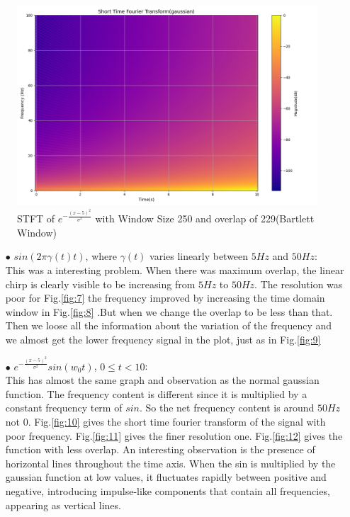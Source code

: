 \documentclass[12pt,a4paper,onecolumn]{exam}
\begin{document}
\begin{solution}
\begin{itemize}
\begin{itemize}
        \begin{figure}[H]
        \centering
        \includegraphics[scale = 0.35]{gaussian_21_250.0.png}
        \caption{STFT of $e^{-\frac{(x-5)^2}{\sigma^2}}$ with Window Size 250 and overlap of 229(Bartlett Window)}
        \label{fig:6}
        \end{figure}
      
      \begin{itemize}

      \item[$\bullet$] $sin(2\pi\gamma(t)t)$, where $\gamma(t)$ varies linearly between $5Hz$ and $50Hz$: \\
      This was a interesting problem. When there was maximum overlap, the linear chirp is clearly visible to be increasing from $5Hz$ to $50Hz$. The resolution was poor for Fig.\ref{fig:7} the frequency improved by increasing the time domain window in Fig.\ref{fig:8} .But when we change the overlap to be less than that. Then we loose all the information about the variation of the frequency and we almost get the lower frequency signal in the plot, just as in Fig.\ref{fig:9}

      \end{itemize}
      \begin{itemize}
      \item[$\bullet$] $e^{-\frac{(x-5)^2}{\sigma^2}}sin(w_0t)$, $0 \leq t < 10$: \\
      This has almost the same graph and observation as the normal gaussian function. The frequency content is different since it is multiplied by a constant frequency term of $sin$. So the net frequency content is around $50Hz$ not $0$. Fig.\ref{fig:10} gives the short time fourier transform of the signal with poor frequency. Fig.\ref{fig:11} gives the finer resolution one. Fig.\ref{fig:12} gives the function with less overlap. An interesting observation is the presence of horizontal lines throughout the time axis. When the sin is multiplied by the gaussian function at low values, it fluctuates rapidly between positive and negative, introducing impulse-like components that contain all frequencies, appearing as vertical lines.
      \end{itemize}


\end{itemize}
\end{itemize}
\end{solution}
\end{document}
